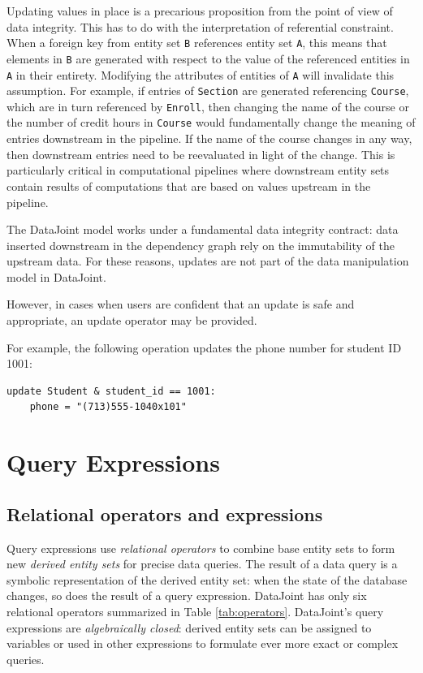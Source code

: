 \documentclass[letter,10pt]{article}
\newcommand{\datajoint}{DataJoint\xspace}
\begin{document}
Updating values in place is a precarious proposition from the point of view of data integrity. 
This has to do with the interpretation of referential constraint.  
When a foreign key from entity set \lstinline$B$ references entity set \lstinline$A$, this means that elements in \lstinline$B$ are generated with respect to the value of the referenced entities in \lstinline$A$ in their entirety.  
Modifying the attributes of entities of \lstinline$A$ will invalidate this assumption.
For example, if entries of \lstinline$Section$ are generated referencing \lstinline$Course$, which are in turn referenced by \lstinline$Enroll$, then changing the name of the course or the number of credit hours in \lstinline$Course$ would fundamentally change the meaning of entries downstream in the pipeline.  
If the name of the course changes in any way, then downstream entries need to be reevaluated in light of the change.
This is particularly critical in computational pipelines where downstream entity sets contain results of computations that are based on values upstream in the pipeline.  

The \datajoint model works under a fundamental data integrity contract: data inserted downstream in the dependency graph rely on the immutability of the upstream data. 
For these reasons, updates are not part of the data manipulation model in \datajoint.

However, in cases when users are confident that an update is safe and appropriate, an update operator may be provided.

For example, the following operation updates the phone number for student ID 1001:
\begin{lstlisting}[language=dj]
update Student & student_id == 1001:
    phone = "(713)555-1040x101"
\end{lstlisting}

\section{Query Expressions}\label{sec:query}

\subsection{Relational operators and expressions}
Query expressions use \emph{relational operators} to combine base entity sets to form new \emph{derived entity sets} for precise data queries.
The result of a data query is a symbolic representation of the derived entity set: when the state of the database changes, so does the result of a query expression.
\datajoint has only six relational operators summarized in Table \ref{tab:operators}.
\datajoint's query expressions are \emph{algebraically closed}:  derived entity sets can be assigned to variables or used in other expressions to formulate ever more exact or complex queries.
\end{document}
